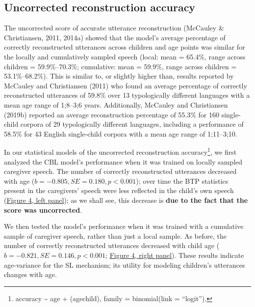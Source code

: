 \documentclass[
  english,
  man,mask,floatsintext]{apa6}
\begin{document}
\hypertarget{uncorrected-reconstruction-accuracy}{%
\subsection{Uncorrected reconstruction accuracy}\label{uncorrected-reconstruction-accuracy}}

The uncorrected score of accurate utterance reconstruction (McCauley \& Christiansen, 2011, 2014a) showed that the model's average percentage of correctly reconstructed utterances across children and age points was similar for the locally and cumulatively sampled speech (local: mean = 65.4\%, range across children = 59.9\%--70.3\%; cumulative: mean = 59.9\%, range across children = 53.1\%--68.2\%). This is similar to, or slightly higher than, results reported by McCauley and Christiansen (2011) who found an average percentage of correctly reconstructed utterances of 59.8\% over 13 typologically different languages with a mean age range of 1;8--3;6 years. Additionally, McCauley and Christiansen (2019b) reported an average reconstruction percentage of 55.3\% for 160 single-child corpora of 29 typologically different languages, including a performance of 58.5\% for 43 English single-child corpora with a mean age range of 1;11--3;10.

In our statistical models of the uncorrected reconstruction accuracy\footnote{accuracy \textasciitilde{} age + (age\textbar child), family = binomial(link = \enquote{logit}).}, we first analyzed the CBL model's performance when it was trained on locally sampled caregiver speech. The number of correctly reconstructed utterances decreased with age (\(b = -0.805, SE = 0.180, p < 0.001\)); over time the BTP statistics present in the caregivers' speech were less reflected in the child's own speech (\protect\hyperlink{fig4}{Figure 4, left panel}); as we shall see, this decrease is \textbf{due to the fact that the score was uncorrected}.

We then tested the model's performance when it was trained with a cumulative sample of caregiver speech, rather than just a local sample. As before, the number of correctly reconstructed utterances decreased with child age (\(b=-0.821, SE = 0.146, p < 0.001\); \protect\hyperlink{fig4}{Figure 4, right panel}). These results indicate age-variance for the SL mechanism; its utility for modeling children's utterances changes with age.
\end{document}
